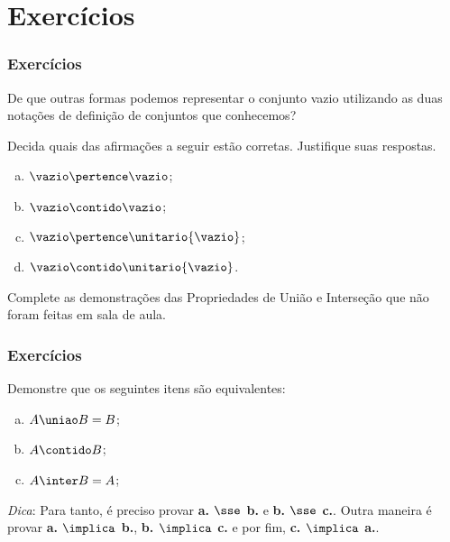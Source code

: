 \section{Exercícios}


\begin{frame}
	\frametitle{Exercícios}

	\begin{exercicio}
		De que outras formas podemos representar o conjunto vazio utilizando as duas notações de definição de conjuntos que conhecemos?
	\end{exercicio}


	\begin{exercicio}
		Decida quais das afirmações a seguir estão corretas. Justifique suas respostas.
		\begin{enumerate}[a.]
			\item $\vazio \pertence \vazio$;
			\item $\vazio \contido  \vazio$;
			\item $\vazio \pertence \unitario{\vazio}$;
			\item $\vazio \contido  \unitario{\vazio}$.
		\end{enumerate}
	\end{exercicio}

	\begin{exercicio}
		Complete as demonstrações das Propriedades de União e Interseção que não foram feitas em sala de aula.
	\end{exercicio}
\end{frame}


\begin{frame}
	\frametitle{Exercícios}
	
	\begin{exercicio}
		Demonstre que os seguintes itens são equivalentes:
		
		\begin{enumerate}[a.]
			\item $A \uniao B = B$;
			\item $A \contido B$;
			\item $A \inter B = A$;
		\end{enumerate}
		
		\textit{Dica}: Para tanto, é preciso provar \textbf{a. $\sse$ b.} e \textbf{b. $\sse$ c.}. Outra maneira é provar \textbf{a. $\implica$ b.}, \textbf{b. $\implica$ c.} e por fim, \textbf{c. $\implica$ a.}.
	\end{exercicio}
\end{frame}


